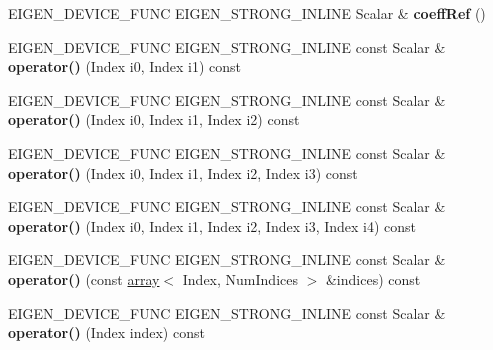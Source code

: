 \begin{DoxyCompactItemize}
E\+I\+G\+E\+N\+\_\+\+D\+E\+V\+I\+C\+E\+\_\+\+F\+U\+NC E\+I\+G\+E\+N\+\_\+\+S\+T\+R\+O\+N\+G\+\_\+\+I\+N\+L\+I\+NE Scalar \& {\bfseries coeff\+Ref} ()
\item 
\mbox{\label{class_eigen_1_1_tensor_fixed_size_a5a4aa31a297d2a37985c920b482e65d2}} 
E\+I\+G\+E\+N\+\_\+\+D\+E\+V\+I\+C\+E\+\_\+\+F\+U\+NC E\+I\+G\+E\+N\+\_\+\+S\+T\+R\+O\+N\+G\+\_\+\+I\+N\+L\+I\+NE const Scalar \& {\bfseries operator()} (Index i0, Index i1) const
\item 
\mbox{\label{class_eigen_1_1_tensor_fixed_size_a3984ef01d56ed7b592a41a7fa1d189c7}} 
E\+I\+G\+E\+N\+\_\+\+D\+E\+V\+I\+C\+E\+\_\+\+F\+U\+NC E\+I\+G\+E\+N\+\_\+\+S\+T\+R\+O\+N\+G\+\_\+\+I\+N\+L\+I\+NE const Scalar \& {\bfseries operator()} (Index i0, Index i1, Index i2) const
\item 
\mbox{\label{class_eigen_1_1_tensor_fixed_size_ac466617802d0eff23691fdbfca00b8d9}} 
E\+I\+G\+E\+N\+\_\+\+D\+E\+V\+I\+C\+E\+\_\+\+F\+U\+NC E\+I\+G\+E\+N\+\_\+\+S\+T\+R\+O\+N\+G\+\_\+\+I\+N\+L\+I\+NE const Scalar \& {\bfseries operator()} (Index i0, Index i1, Index i2, Index i3) const
\item 
\mbox{\label{class_eigen_1_1_tensor_fixed_size_a2b5d80e6ff88759a7ac62a5ea107ad2a}} 
E\+I\+G\+E\+N\+\_\+\+D\+E\+V\+I\+C\+E\+\_\+\+F\+U\+NC E\+I\+G\+E\+N\+\_\+\+S\+T\+R\+O\+N\+G\+\_\+\+I\+N\+L\+I\+NE const Scalar \& {\bfseries operator()} (Index i0, Index i1, Index i2, Index i3, Index i4) const
\item 
\mbox{\label{class_eigen_1_1_tensor_fixed_size_a21f7b374704b4825632d6525930f269d}} 
E\+I\+G\+E\+N\+\_\+\+D\+E\+V\+I\+C\+E\+\_\+\+F\+U\+NC E\+I\+G\+E\+N\+\_\+\+S\+T\+R\+O\+N\+G\+\_\+\+I\+N\+L\+I\+NE const Scalar \& {\bfseries operator()} (const \hyperlink{class_eigen_1_1array}{array}$<$ Index, Num\+Indices $>$ \&indices) const
\item 
\mbox{\label{class_eigen_1_1_tensor_fixed_size_a8241ef50e8831bc0187214ab14283d0e}} 
E\+I\+G\+E\+N\+\_\+\+D\+E\+V\+I\+C\+E\+\_\+\+F\+U\+NC E\+I\+G\+E\+N\+\_\+\+S\+T\+R\+O\+N\+G\+\_\+\+I\+N\+L\+I\+NE const Scalar \& {\bfseries operator()} (Index index) const

\end{DoxyCompactItemize}
